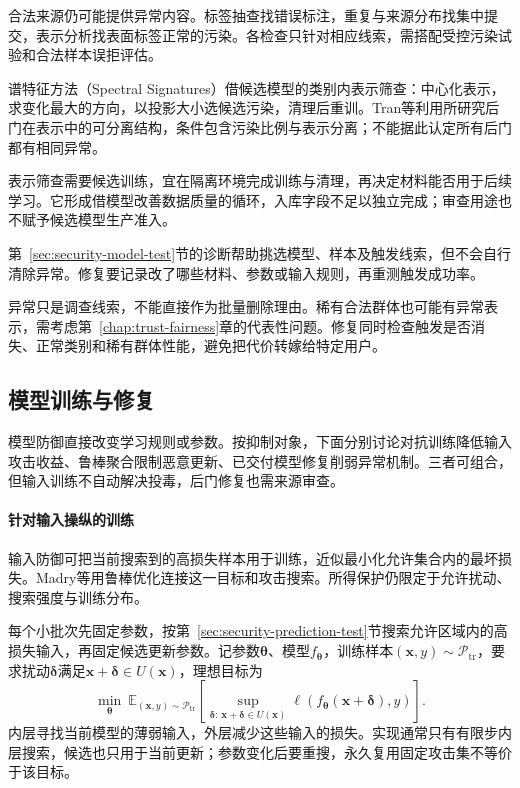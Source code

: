 合法来源仍可能提供异常内容。标签抽查找错误标注，重复与来源分布找集中提交，表示分析找表面标签正常的污染。各检查只针对相应线索，需搭配受控污染试验和合法样本误拒评估。

谱特征方法（Spectral Signatures）借候选模型的类别内表示筛查：中心化表示，求变化最大的方向，以投影大小选候选污染，清理后重训。Tran等利用所研究后门在表示中的可分离结构，条件包含污染比例与表示分离；不能据此认定所有后门都有相同异常。

表示筛查需要候选训练，宜在隔离环境完成训练与清理，再决定材料能否用于后续学习。它形成借模型改善数据质量的循环，入库字段不足以独立完成；审查用途也不赋予候选模型生产准入。

第~\ref{sec:security-model-test}节的诊断帮助挑选模型、样本及触发线索，但不会自行清除异常。修复要记录改了哪些材料、参数或输入规则，再重测触发成功率。

异常只是调查线索，不能直接作为批量删除理由。稀有合法群体也可能有异常表示，需考虑第~\ref{chap:trust-fairness}章的代表性问题。修复同时检查触发是否消失、正常类别和稀有群体性能，避免把代价转嫁给特定用户。

\subsection{模型训练与修复}
\label{sec:security-prediction-defense}
\label{sec:security-model-defense}

模型防御直接改变学习规则或参数。按抑制对象，下面分别讨论对抗训练降低输入攻击收益、鲁棒聚合限制恶意更新、已交付模型修复削弱异常机制。三者可组合，但输入训练不自动解决投毒，后门修复也需来源审查。

\paragraph{针对输入操纵的训练}

输入防御可把当前搜索到的高损失样本用于训练，近似最小化允许集合内的最坏损失。Madry等用鲁棒优化连接这一目标和攻击搜索。所得保护仍限定于允许扰动、搜索强度与训练分布。

每个小批次先固定参数，按第~\ref{sec:security-prediction-test}节搜索允许区域内的高损失输入，再固定候选更新参数。记参数$\bm\theta$、模型$f_{\bm\theta}$，训练样本$(\bm x,y)\sim\mathcal P_{\mathrm{tr}}$，要求扰动$\bm\delta$满足$\bm x+\bm\delta\in U(\bm x)$，理想目标为
\begin{equation}
 \min_{\bm\theta}\ \mathbb E_{(\bm x,y)\sim\mathcal P_{\mathrm{tr}}}
 \left[\sup_{\bm\delta:\,\bm x+\bm\delta\in U(\bm x)}
  \ell(f_{\bm\theta}(\bm x+\bm\delta),y)\right].
 \label{eq:security-adversarial-training}
\end{equation}
内层寻找当前模型的薄弱输入，外层减少这些输入的损失。实现通常只有有限步内层搜索，候选也只用于当前更新；参数变化后要重搜，永久复用固定攻击集不等价于该目标。

